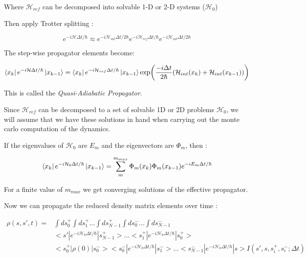 Where $\mathcal{H}_{ref}$ can be decomposed into solvable 1-D or 2-D systems ($\mathcal{H}_0$) 

Then apply Trotter splitting : 

\begin{equation}
e^{-i \mathcal{H} \Delta t /\hbar} \approx e^{-i\mathcal{H}_{int}\Delta t / 2\hbar}e^{-i\mathcal{H}_{ref}\Delta t / \hbar}e^{-i\mathcal{H}_{int}\Delta t / 2\hbar}
\end{equation}

The step-wise propagator elements become:

\begin{equation}
\bra{x_k}e^{-i \mathcal{H} \Delta t / \hbar} \ket{x_{k-1}} = \bra{x_k}e^{-i \mathcal{H}_{ref} \Delta t / \hbar}\ket{x_{k-1}}  \exp(\frac{-i \Delta t}{2 \hbar}(\mathcal{H}_{int}(x_k) + \mathcal{H}_{int}(x_{k-1})))
\end{equation}

This is called the \emph{Quasi-Adiabatic Propagator}.

Since $\mathcal{H}_{ref}$ can be decomposed to a set of solvable 1D or 2D problems $\mathcal{H}_0$, we will assume that we have these solutions in hand when carrying out the monte carlo computation of the dynamics.


If the eigenvalues of $\mathcal{H}_0$ are $E_m$ and the eigenvectors are $\Phi_m$, then :

\begin{equation}
\bra{x_k}e^{-i \mathcal{H}_{0} \Delta t / \hbar}\ket{x_{k-1}} = \sum_{m}^{m_{max}} \Phi_m (x_k) \Phi_m(x_{k-1}) e^{-iE_{m}\Delta t / \hbar}
\end{equation}

For a finite value of $m_{max}$ we get converging solutions of the effective propagator.

Now we can propagate the reduced density matrix elements over time :

\begin{equation}
\begin{split}
\rho(s, s', t) = & \int ds_0^{+} \int ds_1^{+} ... \int ds_{N-1}^{+} \int ds_{0}^{-} ... \int ds_{N-1}^{-} \\ &  <s'|e^{-i \mathscr{H}_{0} \Delta t / \hbar}|s_{N-1}^{+}> ... <s_1^{+}|e^{-i \mathscr{H}_{0} \Delta t / \hbar}|s_0^{+}> \\ & <s_0^{+}|\rho(0)|s_0^{-}> <s_0^{-}|e^{-i \mathscr{H}_{0} \Delta t / \hbar}|s_1^{-}> ...<s_{N-1}^{-}|e^{-i \mathscr{H}_{0} \Delta t / \hbar}|s>I(s', s, s_i^{+}, s_i^{-} ; \Delta t)
\end{split}
\end{equation}

